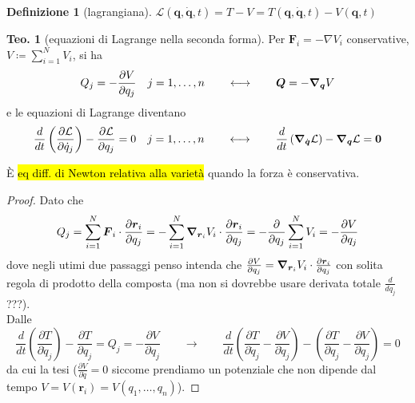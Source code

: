 \documentclass[a4paper,10pt]{article}
\theoremstyle{definition}
\newcommand{\bv}{\boldsymbol} %
\theoremstyle{indentdefinition}
\newtheorem{defn}{Definizione}[section]
\theoremstyle{indenttheorem}
\newtheorem{thm}{Teo.}
\theoremstyle{myremark}
\theoremstyle{indentgeneral}
\newenvironment{myboxed} 
{\noindent\begin{lrbox}{\mybox}\begin{minipage}{\textwidth}}
{\end{minipage}\end{lrbox}\fbox{\usebox{\mybox}}}
\begin{document}
\begin{defn}[lagrangiana]
\label{def:lagrangiana}$\mathcal{L}\left(\bv{q},\dot{\bv{q}},t\right)=T-V=T\left(\bv{q},\dot{\bv{q}},t\right)-V\left(\bv{q},t\right)$
\end{defn}

\begin{myboxed}
\begin{thm}[equazioni di Lagrange nella seconda forma]
\label{thm:seconda-forma-Lagrange}Per $\boldsymbol{F}_{i}=-\nabla V_{i}$
conservative, $V\coloneqq \sum_{i=1}^NV_i$, si ha
$$Q_{j}=-\frac{\partial V}{\partial q_{j}}\quad j=1,\dots,n\qquad\longleftrightarrow\qquad \bv{Q}=-\grad_{\bv{q}}V$$
e le equazioni di Lagrange diventano
\[
\frac{d}{dt}\left(\frac{\partial\mathcal{L}}{\partial\dot{q}_{j}}\right)-\frac{\partial\mathcal{L}}{\partial q_{j}}=0 \quad j=1,\dots, n
\qquad\longleftrightarrow\qquad\frac{d}{dt}\left(\grad_{\dot{\bv{q}}}\mathcal{L}\right)-\grad_{\bv{q}}\mathcal{L}=\bv{0}\]

È \hl{eq diff. di Newton relativa alla varietà} quando la forza è conservativa.
\end{thm}
\end{myboxed}

\begin{proof}
Dato che $$Q_{j}=\sum_{i=1}^{N}\boldsymbol{F}_{i}\cdot\frac{\partial\boldsymbol{r}_{i}}{\partial q_{j}}=-\sum_{i=1}^{N}\grad_{\bv{r}_i} V_i\cdot\frac{\partial\boldsymbol{r}_{i}}{\partial q_{j}}=-\frac{\partial}{\partial q_{j}}\sum_{i=1}^{N}V_i=-\frac{\partial V}{\partial q_{j}}$$
dove negli utimi due passaggi penso intenda che $\frac{\partial V}{\partial q_j}=\grad_{\bv{r}_i}V_i\cdot\frac{\partial\boldsymbol{r}_{i}}{\partial q_{j}}$ con solita regola di prodotto della composta (ma non si dovrebbe usare derivata totale $\frac{d}{dq_j}$ ???). \\
Dalle 
\[
\frac{d}{dt}\left(\frac{\partial T}{\partial\dot{q}_{j}}\right)-\frac{\partial T}{\partial q_{j}}=Q_{j}=-\frac{\partial V}{\partial q_{j}}\qquad\longrightarrow\qquad\frac{d}{dt}\left(\frac{\partial T}{\partial\dot{q}_{j}}-\boxed{\frac{\partial V}{\partial\dot{q}_{j}}}\right)-\left(\frac{\partial T}{\partial q_{j}}-\frac{\partial V}{\partial q_{j}}\right)=0
\]
da cui la tesi ($\frac{\partial V}{\partial\dot{q}}=0$ siccome prendiamo un potenziale che non dipende dal tempo $V=V\left(\boldsymbol{r}_{i}\right)=V\left(q_{1},\ldots,q_{n}\right)$).
\end{proof}
\end{document}
